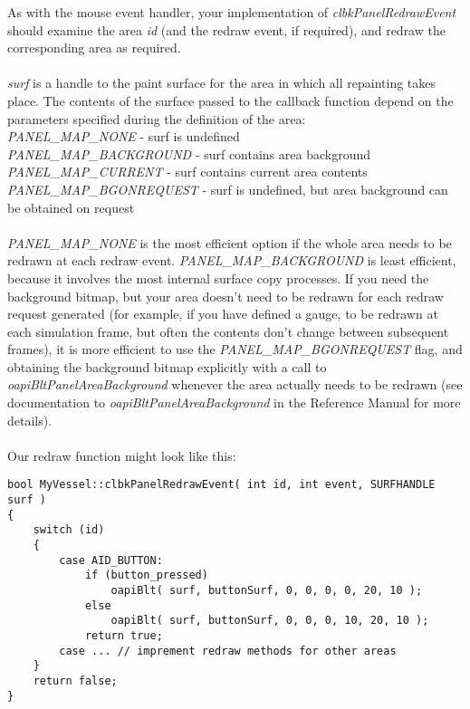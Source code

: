 \documentclass[Orbiter Developer Manual.tex]{subfiles}
\begin{document}
\noindent
As with the mouse event handler, your implementation of \textit{clbkPanelRedrawEvent} should examine the area \textit{id} (and the redraw event, if required), and redraw the corresponding area as required.\\
\\
\textit{surf} is a handle to the paint surface for the area in which all repainting takes place. The contents of the surface passed to the callback function depend on the parameters specified during the definition of the area:\\
\textit{PANEL\_MAP\_NONE} - surf is undefined\\
\textit{PANEL\_MAP\_BACKGROUND} - surf contains area background\\
\textit{PANEL\_MAP\_CURRENT} - surf contains current area contents\\
\textit{PANEL\_MAP\_BGONREQUEST} - surf is undefined, but area background can be obtained on request\\
\\
\textit{PANEL\_MAP\_NONE} is the most efficient option if the whole area needs to be redrawn at each redraw event. \textit{PANEL\_MAP\_BACKGROUND} is least efficient, because it involves the most internal surface copy processes. If you need the background bitmap, but your area doesn't need to be redrawn for each redraw request generated (for example, if you have defined a gauge, to be redrawn at each simulation frame, but often the contents don't change between subsequent frames), it is more efficient to use the \textit{PANEL\_MAP\_BGONREQUEST} flag, and obtaining the background bitmap explicitly with a call to \textit{oapiBltPanelAreaBackground} whenever the area actually needs to be redrawn (see documentation to \textit{oapiBltPanelAreaBackground} in the Reference Manual for more details).\\
\\
Our redraw function might look like this:

\begin{lstlisting}
bool MyVessel::clbkPanelRedrawEvent( int id, int event, SURFHANDLE surf )
{
	switch (id)
	{
		case AID_BUTTON:
			if (button_pressed)
				oapiBlt( surf, buttonSurf, 0, 0, 0, 0, 20, 10 );
			else
				oapiBlt( surf, buttonSurf, 0, 0, 0, 10, 20, 10 );
			return true;
		case ... // imprement redraw methods for other areas
	}
	return false;
}
\end{lstlisting}
\end{document}
